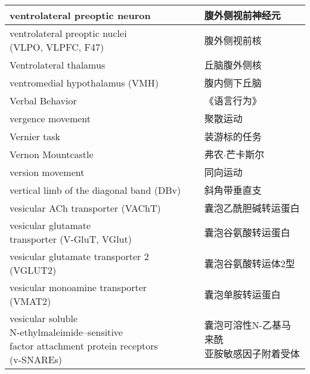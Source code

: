 \begin{longtable}{lll}
	\midrule
	ventrolateral preoptic neuron   && 腹外侧视前神经元  \\
	
	\midrule
	\makecell[l]{ventrolateral preoptic nuclei\\ (VLPO, VLPFC, F47)}  && 腹外侧视前核  \\
	
	\midrule
	Ventrolateral thalamus   && 丘脑腹外侧核  \\
	
	\midrule
	ventromedial hypothalamus (VMH)  && 腹内侧下丘脑  \\
	
	\midrule
	Verbal Behavior   && 《语言行为》  \\
	
	\midrule
	vergence movement   && 聚散运动  \\
	
	\midrule
	Vernier task   && 装游标的任务  \\
	
	\midrule
	Vernon Mountcastle   && 弗农$\cdot$芒卡斯尔  \\
	
	\midrule
	version movement   && 同向运动  \\
	
	\midrule
	vertical limb of the diagonal band (DBv)    &&  斜角带垂直支  \\
	
	\midrule
	vesicular ACh transporter (VAChT)   && 囊泡乙酰胆碱转运蛋白  \\
	
	\midrule
	\makecell[l]{vesicular glutamate \\transporter (V-GluT, VGlut)}   && 囊泡谷氨酸转运蛋白  \\
	
	\midrule
	vesicular glutamate transporter 2 (VGLUT2)   && 囊泡谷氨酸转运体2型  \\
	
	\midrule
	vesicular monoamine transporter (VMAT2)   && 囊泡单胺转运蛋白  \\
	
	\midrule
	\makecell[l]{vesicular soluble \\N-ethylmaleimide–sensitive \\factor attachment protein receptors\\ (v-SNAREs)}  && \makecell[l]{囊泡可溶性N-乙基马来酰\\亚胺敏感因子附着受体}  \\
	

\end{longtable}
